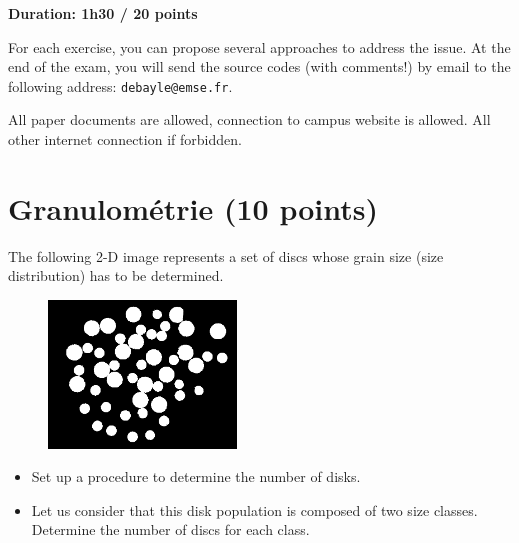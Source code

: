 

\noindent
{\bf Duration: 1h30 / 20 points\\}

\begin{note}For each exercise, you can propose several approaches to address the issue. At the end of the exam, you will send the source codes (with comments!) by email to the following address: \texttt{debayle@emse.fr}.
\vspace{.5cm}

All paper documents are allowed, connection to campus website is allowed. All other internet connection if forbidden.\end{note}

\section{Granulométrie (10 points)}
The following 2-D image represents a set of discs whose grain size (size distribution) has to be determined. %
\begin{figure}[h]
\begin{center}
{\includegraphics[width=5cm]{disks.png}}
\end{center}
\end{figure}

\begin{qbox}
\begin{itemize}
\item Set up a procedure to determine the number of disks.
\item Let us consider that this disk population is composed of two size classes. Determine the number of discs for each class.
\end{itemize}
\end{qbox}

